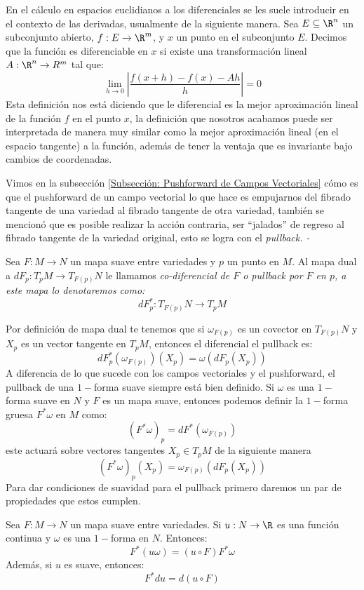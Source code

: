 En el cálculo en espacios euclidianos a los diferenciales se les suele introducir en el contexto de las derivadas, usualmente de la siguiente manera. Sea $E \subseteq \R^n$ un subconjunto abierto, $f: E \to \R^m$, y $x$ un punto en el subconjunto $E$. Decimos que la función es diferenciable en $x$ si existe una transformación lineal $A: \R^n \to R^m$ tal que:
\[
	\lim_{h \to 0} \left| \frac{f(x+h) - f(x) - Ah}{h} \right| = 0
\]
Esta definición nos está diciendo que le diferencial es la mejor aproximación lineal de la función $f$ en el punto $x$, la definición que nosotros acabamos puede ser interpretada de manera muy similar como la mejor aproximación lineal (en el espacio tangente) a la función, además de tener la ventaja que es invariante bajo cambios de coordenadas.

Vimos en la subsección \ref{Subsección: Pushforward de Campos Vectoriales} cómo es que el pushforward de un campo vectorial lo que hace es empujarnos del fibrado tangente de una variedad al fibrado tangente de otra variedad, también se mencionó que es posible realizar la acción contraria, ser \enquote{jalados} de regreso al fibrado tangente de la variedad original, esto se logra con el \it{pullback}.
-
\begin{definition}[Pullback]
	Sea $F: M \to N$ un mapa suave entre variedades y $p$ un punto en $M$. Al mapa dual a $dF_p: T_pM \to T_{F(p)}N$ le llamamos \it{co-diferencial de $F$} o \it{pullback por $F$ en $p$}, a este mapa lo denotaremos como:
	\[
		dF_p^*: T_{F(p)}N \to T_pM
	\]
\end{definition}

Por definición de mapa dual te tenemos que si $\omega_{F(p)}$ es un covector en $T_{F(p)}N$ y $X_p$ es un vector tangente en $T_pM$, entonces el diferencial el pullback es:
\[
	dF_{p}^{*}(\omega_{F(p)})(X_p) = \omega(dF_p(X_p))
\]
A diferencia de lo que sucede con los campos vectoriales y el pushforward, el pullback de una  $1-$forma suave siempre está bien definido. Si $\omega$ es una $1-$forma suave en $N$ y $F$ es un mapa suave, entonces podemos definir la $1-$forma gruesa $F^* \omega$ en $M$ como:
\[
	(F^*\omega)_p = dF^* (\omega_{F(p)})
\]
este actuará sobre vectores tangentes $X_p \in T_pM$ de la siguiente manera
\[
	(F^*\omega)_p(X_p) = \omega_{F(p)}(dF_p(X_p))
\]
Para dar condiciones de suavidad para el pullback primero daremos un par de propiedades que estos cumplen.
\begin{lemma}
	Sea $F: M \to N$ un mapa suave entre variedades. Si $u: N \to \R$ es una función continua y $\omega$ es una $1-$forma en $N$. Entonces:
	\[
		F^{*}(u \omega) = (u \circ F) F^*\omega
	\]
	Además, si $u$ es suave, entonces:
	\[
		F^* du = d(u \circ F)
	\]
\end{lemma}

